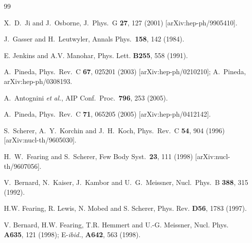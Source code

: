 \documentclass[a4paper,12pt]{article}
\begin{document}
\begin{thebibliography}{99}

  X.~D.~Ji and J.~Osborne,
  J.\ Phys.\ G {\bf 27}, 127 (2001)
  [arXiv:hep-ph/9905410].

  J.~Gasser and H.~Leutwyler,
  Annals Phys.\  {\bf 158}, 142 (1984).


 E. Jenkins and A.V. Manohar, Phys. Lett. {\bf B255}, 558
  (1991).  

  A.~Pineda,
  Phys.\ Rev.\ C {\bf 67}, 025201 (2003)
  [arXiv:hep-ph/0210210]; 
A.~Pineda,
arXiv:hep-ph/0308193.

  A.~Antognini {\it et al.},
  AIP Conf.\ Proc.\  {\bf 796}, 253 (2005).
  

  A.~Pineda,
  Phys.\ Rev.\ C {\bf 71}, 065205 (2005)
  [arXiv:hep-ph/0412142].

  S.~Scherer, A.~Y.~Korchin and J.~H.~Koch,
  Phys.\ Rev.\  C {\bf 54}, 904 (1996)
  [arXiv:nucl-th/9605030].

  H.~W.~Fearing and S.~Scherer,
  Few Body Syst.\  {\bf 23}, 111 (1998)
  [arXiv:nucl-th/9607056].

  
  
  V.~Bernard, N.~Kaiser, J.~Kambor and U.~G.~Meissner,
  Nucl.\ Phys.\ B {\bf 388}, 315 (1992).

 H.W. Fearing, R. Lewis, N. Mobed
and S. Scherer, Phys. Rev. {\bf D56}, 1783 (1997).
 
 V. Bernard, H.W. Fearing, T.R. Hemmert and U.-G.
Meissner, Nucl. Phys. {\bf A635}, 121 (1998); E-{\it ibid.}, {\bf
A642}, 563 (1998).
  

\end{thebibliography}
\end{document}
